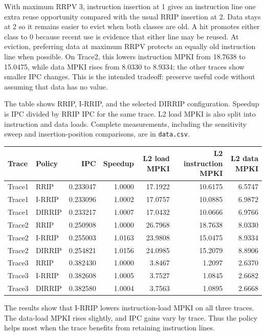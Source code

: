 \documentclass[10pt]{article}
\begin{document}
With maximum RRPV 3, instruction insertion at 1 gives an instruction line one extra reuse opportunity compared with the usual RRIP insertion at 2. Data stays at 2 so it remains easier to evict when both classes are old. A hit promotes either class to 0 because recent use is evidence that either line may be reused. At eviction, preferring data at maximum RRPV protects an equally old instruction line when possible. On Trace2, this lowers instruction MPKI from 18.7638 to 15.0475, while data MPKI rises from 8.0330 to 8.9334; the other traces show smaller IPC changes. This is the intended tradeoff: preserve useful code without assuming that data has no value.

The table shows RRIP, I-RRIP, and the selected DIRRIP configuration. Speedup is IPC divided by RRIP IPC for the same trace. L2 load MPKI is also split into instruction and data loads. Complete measurements, including the sensitivity sweep and insertion-position comparisons, are in \texttt{data.csv}.

\begin{table}[H]
\centering
\begin{tabular}{llrrrrr}
\toprule
Trace & Policy & IPC & Speedup & L2 load MPKI & L2 instruction MPKI & L2 data MPKI \\
\midrule
Trace1 & RRIP & 0.233047 & 1.0000 & 17.1922 & 10.6175 & 6.5747 \\
Trace1 & I-RRIP & 0.233096 & 1.0002 & 17.0757 & 10.0885 & 6.9872 \\
Trace1 & DIRRIP & 0.233217 & 1.0007 & 17.0432 & 10.0666 & 6.9766 \\
Trace2 & RRIP & 0.250908 & 1.0000 & 26.7968 & 18.7638 & 8.0330 \\
Trace2 & I-RRIP & 0.255003 & 1.0163 & 23.9808 & 15.0475 & 8.9334 \\
Trace2 & DIRRIP & 0.254821 & 1.0156 & 24.0985 & 15.2079 & 8.8906 \\
Trace3 & RRIP & 0.382430 & 1.0000 & 3.8467 & 1.2097 & 2.6370 \\
Trace3 & I-RRIP & 0.382608 & 1.0005 & 3.7527 & 1.0845 & 2.6682 \\
Trace3 & DIRRIP & 0.382580 & 1.0004 & 3.7563 & 1.0895 & 2.6668 \\
\bottomrule
\end{tabular}
\end{table}

The results show that I-RRIP lowers instruction-load MPKI on all three traces. The data-load MPKI rises slightly, and IPC gains vary by trace. Thus the policy helps most when the trace benefits from retaining instruction lines.
\end{document}
